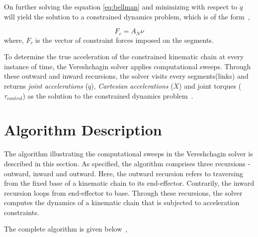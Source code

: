  On further solving the equation \ref{eq:bellman} and minimizing with respect to $\ddot{q}$ will yield the solution to a constrained dynamics problem, which is of the form~\cite{shakhimardanov2015composable}, 
 
  \begin{equation}\label{eq:solution}
  F_c = A_N \nu
  \end{equation}
where, $F_c$ is the vector of constraint forces imposed on the segments.


To determine the true acceleration of the constrained kinematic chain at every instance of time, the Vereshchagin solver applies computational sweeps. Through these outward and inward recursions, the solver visits every segments(links) and returns \textit{joint accelerations} ($\ddot{q}$), \textit{Cartesian accelerations} ($\ddot{X}$) and joint torques ($\tau_{control}$) as the solution to the constrained dynamics problem~\cite{shakhimardanov2015composable}. 

\section{Algorithm Description}

The algorithm illustrating the computational sweeps in the Vereshchagin solver is described in this section. As specified, the algorithm comprises three recursions - outward, inward and outward. Here, the outward recursion refers to traversing from the fixed base of a kinematic chain to its end-effector. Contrarily, the inward recursion loops from end-effector to base. Through these recursions, the solver computes the dynamics of a kinematic chain that is subjected to acceleration constraints. 

	The complete algorithm is given below~\cite{shakhimardanov2015composable},

